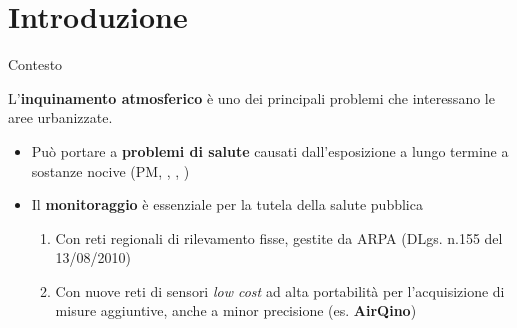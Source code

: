 \section{Introduzione}
\begin{frame}{Contesto}

L’\textbf{inquinamento atmosferico} è uno dei principali problemi che interessano le aree urbanizzate.
\vspace{0.3cm}
\begin{itemize}
 \item Può portare a \textbf{problemi di salute} causati dall’esposizione a lungo termine a sostanze nocive (PM, , , )\vspace{0.3cm}
 \item Il \textbf{monitoraggio} è essenziale per la tutela della salute pubblica\vspace{-.3cm}
 \begin{enumerate}
 \item Con reti regionali di rilevamento fisse, gestite da ARPA (DLgs. n.155 del 13/08/2010)\vspace{0.1cm}
 \item Con nuove reti di sensori \textit{low cost} ad alta portabilità per l'acquisizione di misure aggiuntive, anche a minor precisione (es. \textbf{AirQino})
\end{enumerate}
\end{itemize}

\end{frame}

